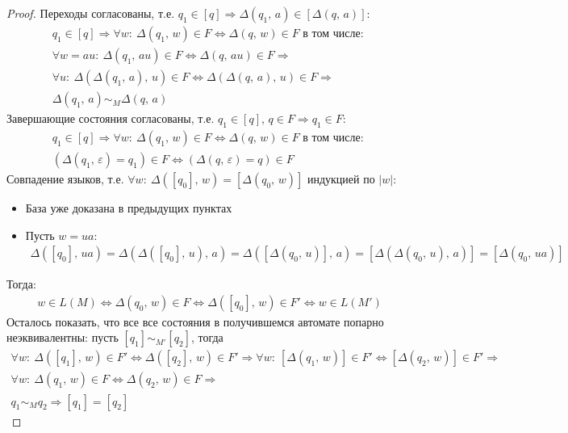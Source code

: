 \documentclass[a4paper,12pt]{article}
\theoremstyle{plain}
\theoremstyle{definition}
\theoremstyle{remark}
\begin{document}
\begin{proof}
	Переходы согласованы, т.е. $q_1 \in [q] \Rightarrow \Delta(q_1,\, a) \in [\Delta(q,\,a)]$:
	\begin{align*}
		q_1 \in [q] \Rightarrow \forall w:\: \Delta(q_1,\,w) \in F \Leftrightarrow \Delta(q,\,w) \in F \text{ в том числе: } \\
		\forall w = au:\: \Delta(q_1,\,au) \in F \Leftrightarrow \Delta(q,\, au) \in F \Rightarrow                           \\
		\forall u:\: \Delta(\Delta(q_1,\,a),\,u) \in F \Leftrightarrow \Delta(\Delta(q,\,a),\,u) \in F \Rightarrow           \\
		\Delta(q_1,\,a) \sim_M \Delta(q,\,a)
	\end{align*}
	Завершающие состояния согласованы, т.е. $q_1 \in [q],\, q \in F \Rightarrow q_1 \in F$:
	\begin{align*}
		q_1 \in [q] \Rightarrow \forall w:\: \Delta(q_1,\,w) \in F \Leftrightarrow \Delta(q,\,w) \in F \text{ в том числе: } \\
		(\Delta(q_1,\,\varepsilon) = q_1) \in F \Leftrightarrow (\Delta(q,\, \varepsilon) = q) \in F
	\end{align*}
	Совпадение языков, т.е. $\forall w :\: \Delta([q_0],\, w) = [\Delta(q_0,\,w)]$ индукцией по $|w|$:
	\begin{itemize}
		\item База уже доказана в предыдущих пунктах
		\item Пусть $w = ua$:
		      \begin{align*}
			      \Delta([q_0],\, ua) = \Delta(\Delta([q_0],\, u),\, a) = \Delta([\Delta(q_0,\, u)],\, a) = [\Delta(\Delta(q_0,\,u),\, a)] = [\Delta(q_0,\,ua)]
		      \end{align*}
	\end{itemize}
	Тогда:
	\begin{align*}
		w \in L(M) \Leftrightarrow \Delta(q_0,\, w) \in F \Leftrightarrow \Delta([q_0],\, w) \in F' \Leftrightarrow w \in L(M')
	\end{align*}
	Осталось показать, что все все состояния в получившемся автомате попарно неэквивалентны: пусть  $[q_1] \sim_{M'} [q_2]$, тогда
	\begin{align*}
		\forall w :\: \Delta([q_1],\, w) \in F' \Leftrightarrow \Delta([q_2],\,w) \in F' \Rightarrow \forall w :\: [\Delta(q_1,\,w)] \in F' \Leftrightarrow [\Delta(q_2,\,w)] \in F' \Rightarrow \\
		\forall w :\: \Delta(q_1,\, w) \in F \Leftrightarrow \Delta(q_2,\,w) \in F \Rightarrow                                                                                                   \\
		q_1 \sim_M q_2 \Rightarrow [q_1] = [q_2]
	\end{align*}

\end{proof}
\end{document}
